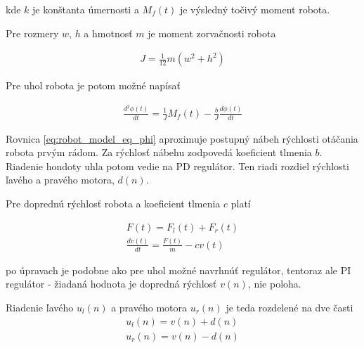 kde $k$ je konštanta úmernosti a $M_f(t)$ je výsledný točivý moment robota.

Pre rozmery $w$, $h$ a hmotnosť $m$ je moment zorvačnosti robota

\begin{align}
  J = \frac{1}{12}m(w^2 + h^2)
\end{align}

Pre uhol robota je potom možné napísať

\begin{align}
  \frac{d^2\phi(t)}{dt} = \frac{1}{J}M_f(t) - \frac{b}{J}\frac{d\phi(t)}{dt}
  \label{eq:robot_model_eq_phi}
\end{align}

Rovnica \ref{eq:robot_model_eq_phi} aproximuje postupný nábeh rýchlosti
otáčania robota prvým rádom. Za rýchlosť nábehu zodpovedá koeficient tlmenia $b$.
Riadenie hondoty uhla potom vedie na PD regulátor. Ten riadi rozdiel rýchlosti ľavého a pravého motora, $d(n)$.


Pre doprednú rýchlosť robota a koeficient tlmenia $c$ platí

\begin{align}
  F(t) = F_l(t) + F_r(t) \\
 \frac{dv(t)}{dt} = \frac{F(t)}{m} - cv(t)
\end{align}

po úpravach je podobne ako pre uhol možné navrhnúť regulátor,
tentoraz ale PI regulátor - žiadaná hodnota je dopredná rýchlosť $v(n)$, nie poloha.

Riadenie ľavého $u_l(n)$ a pravého motora $u_r(n)$ je teda rozdelené na dve časti
\begin{align}
  u_l(n) = v(n) + d(n) \\
  u_r(n) = v(n) - d(n) \\
\end{align}

